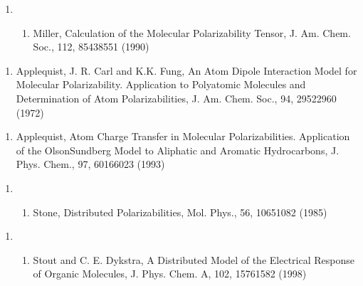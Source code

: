 \documentclass[letterpaper,11pt,english]{sphinxmanual}
\begin{document}
\begin{enumerate}
%
\setcounter{enumi}{10}
\item {} \begin{enumerate}
%
\setcounter{enumii}{9}
\item {} 
Miller, Calculation of the Molecular Polarizability Tensor, J. Am. Chem. Soc., 112, 8543\sphinxhyphen{}8551 (1990)

\end{enumerate}

\end{enumerate}
\begin{enumerate}
%
\setcounter{enumi}{9}
\item {} 
Applequist, J. R. Carl and K.\sphinxhyphen{}K. Fung, An Atom Dipole Interaction Model for Molecular Polarizability. Application to Polyatomic Molecules and Determination of Atom Polarizabilities, J. Am. Chem. Soc., 94, 2952\sphinxhyphen{}2960 (1972)

\end{enumerate}
\begin{enumerate}
%
\setcounter{enumi}{9}
\item {} 
Applequist, Atom Charge Transfer in Molecular Polarizabilities. Application of the Olson\sphinxhyphen{}Sundberg Model to Aliphatic and Aromatic Hydrocarbons, J. Phys. Chem., 97, 6016\sphinxhyphen{}6023 (1993)

\end{enumerate}
\begin{enumerate}
%
\item {} \begin{enumerate}
%
\setcounter{enumii}{9}
\item {} 
Stone, Distributed Polarizabilities, Mol. Phys., 56, 1065\sphinxhyphen{}1082 (1985)

\end{enumerate}

\end{enumerate}
\begin{enumerate}
%
\setcounter{enumi}{9}
\item {} \begin{enumerate}
%
\setcounter{enumii}{12}
\item {} 
Stout and C. E. Dykstra, A Distributed Model of the Electrical Response of Organic Molecules, J. Phys. Chem. A, 102, 1576\sphinxhyphen{}1582 (1998)

\end{enumerate}

\end{enumerate}
\end{document}
